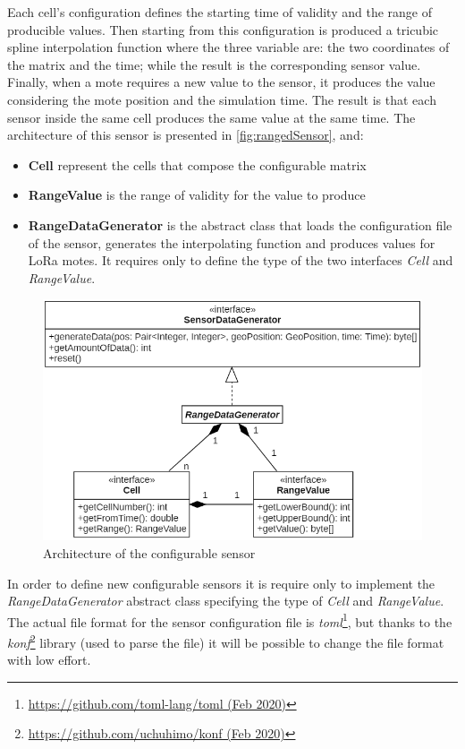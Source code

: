 Each cell's configuration defines the starting time of validity and the range of producible values. 
Then starting from this configuration is produced a tricubic spline interpolation function where the three variable are: the two coordinates of the matrix and the time; while the result is the corresponding sensor value.
Finally, when a mote requires a new value to the sensor, it produces the value considering the mote position and the simulation time.
The result is that each sensor inside the same cell produces the same value at the same time. 
The architecture of this sensor is presented in \autoref{fig:rangedSensor}, and:
\begin{itemize}
    \item \textbf{Cell} represent the cells that compose the configurable matrix
    \item \textbf{RangeValue} is the range of validity for the value to produce
    \item \textbf{RangeDataGenerator} is the abstract class that loads the configuration file of the sensor, generates the interpolating function and produces values for LoRa motes. It requires only to define the type of the two interfaces \textit{Cell} and \textit{RangeValue}.
\end{itemize}
% 
\begin{figure}[h]
    \centering
    \includegraphics[scale=0.7]{figures/rangedSensor.png}
    \caption{Architecture of the configurable sensor}
    \label{fig:rangedSensor}
\end{figure}
% 
In order to define new configurable sensors it is require only to implement the \mbox{\textit{RangeDataGenerator}} abstract class specifying the type of \mbox{\textit{Cell}} and \mbox{\textit{RangeValue}}.
The actual file format for the sensor configuration file is \textit{toml}\footnote{\href{https://github.com/toml-lang/toml}{https://github.com/toml-lang/toml (Feb 2020)}}, but thanks to the \textit{konf}\footnote{\href{https://github.com/uchuhimo/konf}{https://github.com/uchuhimo/konf (Feb 2020)}} library (used to parse the file) it will be possible to change the file format with low effort.

